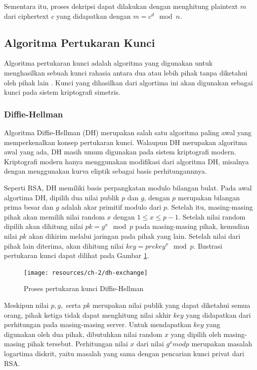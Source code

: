     Sementara itu, proses dekripsi dapat dilakukan dengan menghitung plaintext $m$ dari ciphertext $c$ yang didapatkan dengan $m = c^d \mod n$.


  \subsection{Algoritma Pertukaran Kunci}
  Algoritma pertukaran kunci adalah algoritma yang digunakan untuk menghasilkan sebuah kunci rahasia antara dua atau lebih pihak tanpa diketahui oleh pihak lain \citep{applied_crypto}. Kunci yang dihasilkan dari algortima ini akan digunakan sebagai kunci pada sistem kriptografi simetris.

    \subsubsection{Diffie-Hellman}
    Algoritma Diffie-Hellman (DH) merupakan salah satu algoritma paling awal yang memperkenalkan konsep pertukaran kunci. Walaupun DH merupakan algoritma awal yang ada, DH masih umum digunakan pada sistem kriptografi modern. Kriptografi modern hanya menggunakan modifikasi dari algoritma DH, misalnya dengan menggunakan kurva eliptik sebagai basis perhitungannnya.

    Seperti RSA, DH memiliki basis perpangkatan modulo bilangan bulat. Pada awal algortima DH, dipilih dua nilai publik $p$ dan $g$, dengan $p$ merupakan bilangan prima besar dan $g$ adalah akar primitif modulo dari $p$. Setelah itu, masing-masing pihak akan memilih nilai random $x$ dengan $1 \leq x \leq p-1 $. Setelah nilai random dipilih akan dihitung nilai $pk = g^x \mod p$ pada masing-masing pihak, kemudian nilai $pk$ akan dikirim melalui jaringan pada pihak yang lain. Setelah nilai dari pihak lain diterima, akan dihitung nilai $key = prekey^x \mod p$. Ilustrasi pertukaran kunci dapat dilihat pada Gambar \ref{fig:dh_exchange}.

    \begin{figure}[h]
      \centering
      \texttt{[image: resources/ch-2/dh-exchange]}
      \caption{Proses pertukaran kunci Diffie-Hellman}
      \label{fig:dh_exchange}
    \end{figure}

    Meskipun nilai $p, g, $ serta $pk$ merupakan nilai publik yang dapat diketahui semua orang, pihak ketiga tidak dapat menghitung nilai akhir $key$ yang didapatkan dari perhitungan pada masing-masing server. Untuk mendapatkan $key$ yang digunakan oleh dua pihak, dibutuhkan nilai random $x$ yang dipilih oleh masing-masing pihak tersebut. Perhitungan nilai $x$ dari nilai $g^x mod p$ merupakan masalah logartima diskrit, yaitu masalah yang sama dengan pencarian kunci privat dari RSA.
